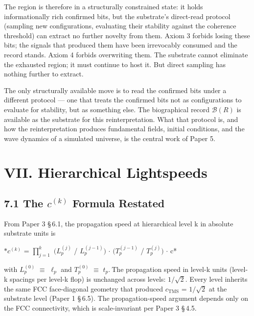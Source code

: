 \documentclass[11pt,oneside]{report}
\theoremstyle{definition}
\theoremstyle{remark}
\begin{document}
The region is therefore in a structurally constrained state: it holds
informationally rich confirmed bits, but the substrate's direct-read
protocol (sampling new configurations, evaluating their stability
against the coherence threshold) can extract no further novelty from
them. Axiom 3 forbids losing these bits; the signals that produced them
have been irrevocably consumed and the record stands. Axiom 4 forbids
overwriting them. The substrate cannot eliminate the exhausted region;
it must continue to host it. But direct sampling has nothing further to
extract.

The only structurally available move is to read the confirmed bits under
a different protocol --- one that treats the confirmed bits not as
configurations to evaluate for stability, but as something else. The
biographical record \ensuremath{\mathcal{B}(R)} is available as the substrate for this
reinterpretation. What that protocol is, and how the reinterpretation
produces fundamental fields, initial conditions, and the wave dynamics
of a simulated universe, is the central work of Paper 5.

\section*{VII. Hierarchical Lightspeeds}

\subsection*{7.1 The \ensuremath{c^{(k)}} Formula Restated}

From Paper 3 \S\,6.1, the propagation speed at hierarchical level k in
absolute substrate units is

\ensuremath{*c^{(k)}} = \ensuremath{\prod _{j=1}^{k}} \ensuremath{(L_{p}^{(j)}} / \ensuremath{L_{p}^{(j-1)})} \ensuremath{\cdot}
\ensuremath{(T_{p}^{(j-1)}} / \ensuremath{T_{p}^{(j)})} \ensuremath{\cdot} c*

with \ensuremath{L_{p}^{(0)}} \ensuremath{\equiv} \ensuremath{\ell_{p}} and \ensuremath{T_{p}^{(0)}} \ensuremath{\equiv} \ensuremath{t_{p}.~\text{The}} propagation speed in
level-k units (level-k spacings per level-k flop) is unchanged across
levels: \ensuremath{1/\sqrt{2}.} Every level inherits the same FCC face-diagonal geometry
that produced \ensuremath{c_{\mathrm{TMS}}} = \ensuremath{1/\sqrt{2}} at the substrate level (Paper 1 \S\,6.5). The
propagation-speed argument depends only on the FCC connectivity, which
is scale-invariant per Paper 3 \S\,4.5.
\end{document}
